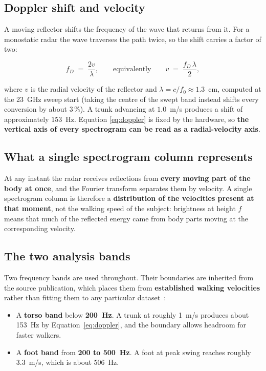 \subsection{Doppler shift and velocity}

A moving reflector shifts the frequency of the wave that returns from it. For a
monostatic radar the wave traverses the path twice, so the shift carries a factor
of two:

\begin{equation}
  f_D \;=\; \frac{2 v}{\lambda}, \qquad\text{equivalently}\qquad
  v \;=\; \frac{f_D \, \lambda}{2},
  \label{eq:doppler}
\end{equation}

\noindent where $v$ is the radial velocity of the reflector and
$\lambda = c / f_0 \approx 1.3$~cm, computed at the 23~GHz sweep start
(taking the centre of the swept band instead shifts every conversion by
about 3\,\%). A trunk advancing at $1.0$~m/s produces a shift of
approximately $153$~Hz. Equation \eqref{eq:doppler} is fixed by the
hardware, so \textbf{the vertical axis of every spectrogram can be read as a
radial-velocity axis}.

\subsection{What a single spectrogram column represents}

At any instant the radar receives reflections from \textbf{every moving part
of the body at once}, and the Fourier transform separates them by velocity. A
single spectrogram column is therefore a \textbf{distribution of the
velocities present at that moment}, not the walking speed of the subject:
brightness at height $f$ means that much of the reflected energy came from
body parts moving at the corresponding velocity.

\subsection{The two analysis bands}

Two frequency bands are used throughout. Their boundaries are inherited from the
source publication, which places them from \textbf{established walking
velocities} rather than fitting them to any particular
dataset~\cite{lopezdelgado2026}:

\begin{itemize}
  \item A \textbf{torso band} below \textbf{200~Hz}. A trunk at roughly 1~m/s
        produces about 153~Hz by Equation~\eqref{eq:doppler}, and the boundary
        allows headroom for faster walkers.
  \item A \textbf{foot band} from \textbf{200 to 500~Hz}. A foot at peak swing
        reaches roughly 3.3~m/s, which is about 506~Hz.
\end{itemize}


